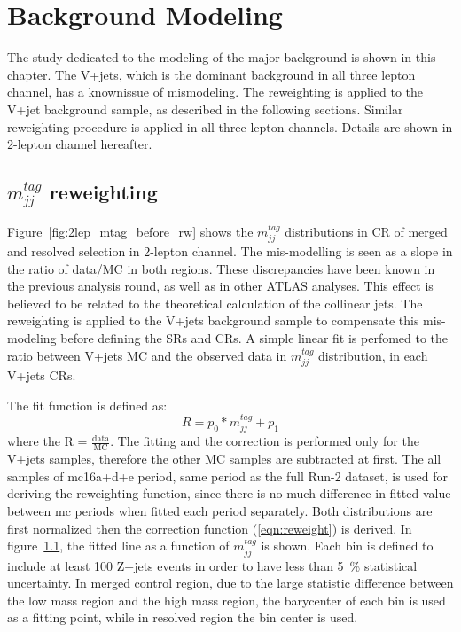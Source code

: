 \chapter{Background Modeling}
\label{chap:modeling}

The study dedicated to the modeling of the major background is shown in this chapter.
The V+jets, which is the dominant background in all three lepton channel, has a knownissue of mismodeling. 
The reweighting is applied to the V+jet background sample, as described in the following sections.
Similar reweighting procedure is applied in all three lepton channels. Details are shown in 2-lepton channel hereafter.

\section{$m_{jj}^{tag}$ reweighting}
Figure~\ref{fig:2lep_mtag_before_rw} shows the $m^{tag}_{jj}$ distributions in CR of merged and resolved selection in 2-lepton channel.
The mis-modelling is seen as a slope in the ratio of data/MC in both regions.
These discrepancies have been known in the previous analysis round, as well as in other ATLAS analyses. 
This effect is believed to be related to the theoretical calculation of the collinear jets.
The reweighting is applied to the V+jets background sample to compensate this mis-modeling before defining the SRs and CRs. 
A simple linear fit is perfomed to the ratio between V+jets MC and the observed data in $m^{tag}_{jj}$ distribution, in each V+jets CRs. 

The fit function is defined as:
\begin{equation}
\label{eqn:reweight}
R=p_{0} * m_{jj}^{tag}+p_{1}
\end{equation}
where the R = $\frac{\mathrm{data}}{\mathrm{MC}}$. 
The fitting and the correction is performed only for the V+jets samples, therefore the other MC samples are subtracted at first. 
The all samples of mc16a+d+e period, same period as the full Run-2 dataset, is used for deriving the reweighting function, since there is no much difference in fitted value between mc periods when fitted each period separately. 
Both distributions are first normalized then the correction function (\ref{eqn:reweight}) is derived. 
In figure~\ref{}, the fitted line as a function of $m^{tag}_{jj}$ is shown. 
Each bin is defined to include at least 100 Z+jets events in order to have less than 5~\% statistical uncertainty. 
In merged control region, due to the large statistic difference between the low mass region and the high mass region, the barycenter of each bin is used as a fitting point, while in resolved region the bin center is used.

